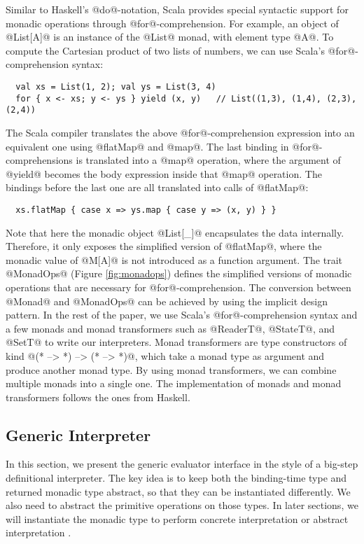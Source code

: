 Similar to Haskell's @do@-notation, Scala provides special syntactic support
for monadic operations through @for@-comprehension.  For example, an object of
@List[A]@ is an instance of the @List@ monad, with element type @A@.
To compute the Cartesian product of two lists of numbers, we can use Scala's
@for@-comprehension syntax:
\begin{lstlisting}
  val xs = List(1, 2); val ys = List(3, 4)
  for { x <- xs; y <- ys } yield (x, y)   // List((1,3), (1,4), (2,3), (2,4))
\end{lstlisting}

The Scala compiler translates the above @for@-comprehension expression into
an equivalent one using @flatMap@ and @map@. The last binding
in @for@-comprehensions is translated into a @map@ operation, where the argument of
@yield@ becomes the body expression inside that @map@ operation. The
bindings before the last one are all translated into calls of @flatMap@:
\begin{lstlisting}
  xs.flatMap { case x => ys.map { case y => (x, y) } }
\end{lstlisting}

Note that here the monadic object @List[_]@ encapsulates the data internally.
Therefore, it only exposes the simplified version of @flatMap@, where the monadic
value of @M[A]@ is not introduced as a function argument. The trait @MonadOps@ (Figure
\ref{fig:monadops}) defines the simplified versions of monadic operations that
are necessary for @for@-comprehension. The conversion between @Monad@ and
@MonadOps@ can be achieved by using the implicit design pattern.
In the rest of the paper, we use Scala's @for@-comprehension syntax and a few
monads and monad transformers such as @ReaderT@, @StateT@, and @SetT@ to
write our interpreters.
Monad transformers are type constructors of kind @(* --> *) --> (* --> *)@, which
take a monad type as argument and produce another monad type. By using monad
transformers, we can combine multiple monads into a single one.  The
implementation of monads and monad transformers follows the ones from Haskell.

\subsection{Generic Interpreter} \label{generic_if}

In this section, we present the generic evaluator interface in the style of a big-step
definitional interpreter. The key idea is to keep both the binding-time type and
returned monadic type abstract, so that they can be instantiated
differently. We also need to abstract the primitive operations on those types.
In later sections, we will instantiate the monadic type to perform concrete
interpretation \cite{DBLP:conf/popl/LiangHJ95} or abstract interpretation
\cite{Sergey:2013:MAI:2491956.2491979, DBLP:journals/pacmpl/DaraisLNH17}.

